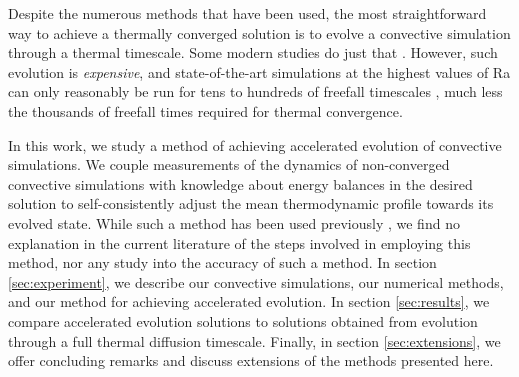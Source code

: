 \documentclass[aps, pre, onecolumn, nofootinbib, notitlepage, groupedaddress, amsfonts, amssymb, amsmath, longbibliography]{revtex4-1}
\begin{document}
Despite the numerous methods that have been used,
the most straightforward way to achieve a thermally converged solution
is to evolve a convective simulation through a thermal timescale. Some modern
studies do just that \cite{featherstone&hindman2016}.
However, such evolution is
\emph{expensive}, and state-of-the-art simulations at the highest values of Ra
can only reasonably be run
for tens to hundreds of freefall timescales \cite{stevens&all2011}, much less the
thousands of freefall times required for thermal convergence.

In this work, we study a method of achieving accelerated evolution of
convective simulations. We couple measurements of the dynamics of non-converged
convective simulations with knowledge about energy balances in the desired solution
to self-consistently adjust the mean thermodynamic profile towards its evolved state. 
While such a method has been used previously \cite{hurlburt&all1986}, 
we find no explanation in the current literature of the steps involved in employing
this method, nor any study into the accuracy of such a method.
In section \ref{sec:experiment}, we describe our convective simulations, our
numerical methods, and our method for achieving accelerated evolution. In
section \ref{sec:results}, we compare accelerated evolution solutions
to solutions obtained from evolution through a full thermal diffusion timescale. Finally,
in section \ref{sec:extensions}, we offer concluding remarks and
discuss extensions of the methods presented here.


\end{document}

